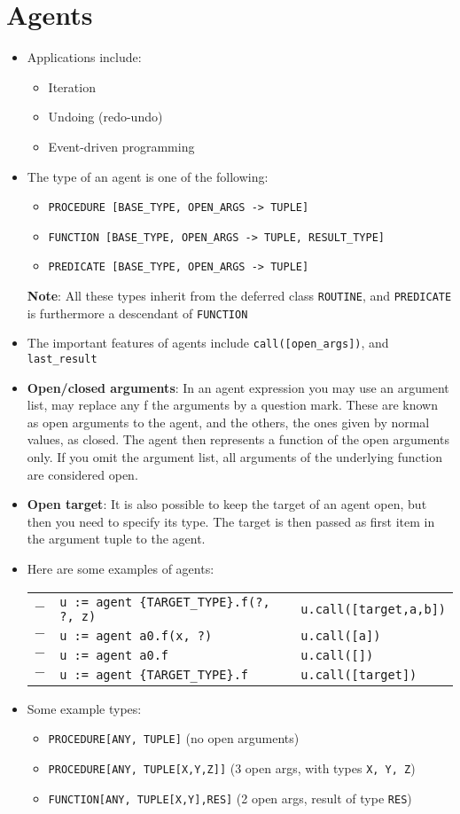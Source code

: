 \documentclass[a4paper]{article}
\newcommand{\inline}[1]{\lstinline!#1!}%
\begin{document}
\section{Agents}
\begin{itemize}
\item Applications include:
\begin{itemize}
\item Iteration
\item Undoing (redo-undo)
\item Event-driven programming
\end{itemize}
\item The type of an agent is one of the following:
\begin{itemize}
\item \inline{PROCEDURE [BASE_TYPE, OPEN_ARGS -> TUPLE]}
\item \inline{FUNCTION [BASE_TYPE, OPEN_ARGS -> TUPLE, RESULT_TYPE]}
\item \inline{PREDICATE [BASE_TYPE, OPEN_ARGS -> TUPLE]}
\end{itemize}
\textbf{Note}: All these types inherit from the deferred class \inline{ROUTINE}, and \inline{PREDICATE} is furthermore a descendant of \inline{FUNCTION}
\item The important features of agents include \inline{call([open_args])}, and \inline{last_result}
\item \textbf{Open/closed arguments}: In an agent expression you may use an argument list, may replace any f the arguments by a question mark. These are known as open arguments to the agent, and the others, the ones given by normal values, as closed. The agent then represents a function of the open arguments only. If you omit the argument list, all arguments of the underlying function are considered open.
\item \textbf{Open target}: It is also possible to keep the target of an agent open, but then you need to specify its type. The target is then passed as first item in the argument tuple to the agent.
\item Here are some examples of agents:\\
\begin{tabular}{r l|l}
$-$ & \inline{u := agent {TARGET_TYPE}.f(?, ?, z)} & \inline{u.call([target,a,b])}\\
$-$ & \inline{u := agent a0.f(x, ?)} & \inline{u.call([a])}\\
$-$ & \inline{u := agent a0.f} & \inline{u.call([])}\\
$-$ & \inline{u := agent {TARGET_TYPE}.f} & \inline{u.call([target])}\\
\end{tabular}
\item Some example types:
\begin{itemize}
\item \inline{PROCEDURE[ANY, TUPLE]} (no open arguments)
\item \inline{PROCEDURE[ANY, TUPLE[X,Y,Z]]} (3 open args, with types \inline{X, Y, Z})
\item \inline{FUNCTION[ANY, TUPLE[X,Y],RES]} (2 open args, result of type \inline{RES})
\end{itemize}
\end{itemize}
\end{document}
